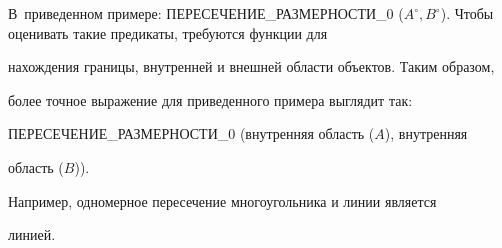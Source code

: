В~приведенном примере: ПЕРЕСЕЧЕНИЕ\_РАЗМЕРНОСТИ\_0 ($A^\circ, 


B^\circ$). Чтобы оценивать такие предикаты, требуются функции для 


на\-хож\-де\-ния границы, внутренней и внешней области объектов. Таким образом, 


более точное выражение для приведенного примера выглядит так: 


ПЕРЕСЕЧЕНИЕ\_РАЗМЕРНОСТИ\_0 (внутренняя область ($A$), внутренняя 


область ($B$)). 




    Например, одномерное пересечение многоугольника и линии является 


линией. 





